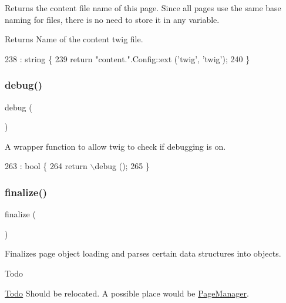 Returns the content file name of this page. Since all pages use the same base naming for files, there is no need to store it in any variable. \begin{DoxyReturn}{Returns}
Name of the content twig file. 
\end{DoxyReturn}

\begin{DoxyCode}
238                                : \textcolor{keywordtype}{string} \{
239         \textcolor{keywordflow}{return} \textcolor{stringliteral}{"content."}.Config::ext (\textcolor{stringliteral}{'twig'}, \textcolor{stringliteral}{'twig'});
240     \}
\end{DoxyCode}
\mbox{\label{class_lora_1_1_page_aaed74f7942d3fc56582e99324500e87b}} 
\subsubsection{\texorpdfstring{debug()}{debug()}}
{\footnotesize\ttfamily debug (\begin{DoxyParamCaption}{ }\end{DoxyParamCaption})}

A wrapper function to allow twig to check if debugging is on. 
\begin{DoxyCode}
263                              : \textcolor{keywordtype}{bool} \{
264         return \(\backslash\)debug ();
265     \}
\end{DoxyCode}
\mbox{\label{class_lora_1_1_page_a9caaa1f5ea6177e55f13ebe7dec2bd60}} 
\subsubsection{\texorpdfstring{finalize()}{finalize()}}
{\footnotesize\ttfamily finalize (\begin{DoxyParamCaption}{ }\end{DoxyParamCaption})}

Finalizes page object loading and parses certain data structures into objects. \begin{DoxyRefDesc}{Todo}
\item[\hyperlink{todo__todo000007}{Todo}]Should be relocated. A possible place would be \hyperlink{class_lora_1_1_page_manager}{Page\+Manager}. \end{DoxyRefDesc}

